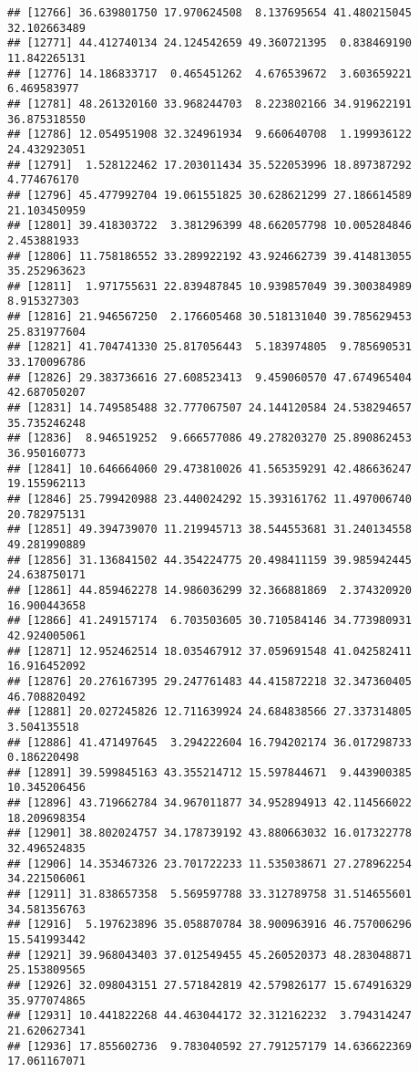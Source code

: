 \documentclass[
]{article}
\begin{document}
\begin{verbatim}
## [12766] 36.639801750 17.970624508  8.137695654 41.480215045 32.102663489
## [12771] 44.412740134 24.124542659 49.360721395  0.838469190 11.842265131
## [12776] 14.186833717  0.465451262  4.676539672  3.603659221  6.469583977
## [12781] 48.261320160 33.968244703  8.223802166 34.919622191 36.875318550
## [12786] 12.054951908 32.324961934  9.660640708  1.199936122 24.432923051
## [12791]  1.528122462 17.203011434 35.522053996 18.897387292  4.774676170
## [12796] 45.477992704 19.061551825 30.628621299 27.186614589 21.103450959
## [12801] 39.418303722  3.381296399 48.662057798 10.005284846  2.453881933
## [12806] 11.758186552 33.289922192 43.924662739 39.414813055 35.252963623
## [12811]  1.971755631 22.839487845 10.939857049 39.300384989  8.915327303
## [12816] 21.946567250  2.176605468 30.518131040 39.785629453 25.831977604
## [12821] 41.704741330 25.817056443  5.183974805  9.785690531 33.170096786
## [12826] 29.383736616 27.608523413  9.459060570 47.674965404 42.687050207
## [12831] 14.749585488 32.777067507 24.144120584 24.538294657 35.735246248
## [12836]  8.946519252  9.666577086 49.278203270 25.890862453 36.950160773
## [12841] 10.646664060 29.473810026 41.565359291 42.486636247 19.155962113
## [12846] 25.799420988 23.440024292 15.393161762 11.497006740 20.782975131
## [12851] 49.394739070 11.219945713 38.544553681 31.240134558 49.281990889
## [12856] 31.136841502 44.354224775 20.498411159 39.985942445 24.638750171
## [12861] 44.859462278 14.986036299 32.366881869  2.374320920 16.900443658
## [12866] 41.249157174  6.703503605 30.710584146 34.773980931 42.924005061
## [12871] 12.952462514 18.035467912 37.059691548 41.042582411 16.916452092
## [12876] 20.276167395 29.247761483 44.415872218 32.347360405 46.708820492
## [12881] 20.027245826 12.711639924 24.684838566 27.337314805  3.504135518
## [12886] 41.471497645  3.294222604 16.794202174 36.017298733  0.186220498
## [12891] 39.599845163 43.355214712 15.597844671  9.443900385 10.345206456
## [12896] 43.719662784 34.967011877 34.952894913 42.114566022 18.209698354
## [12901] 38.802024757 34.178739192 43.880663032 16.017322778 32.496524835
## [12906] 14.353467326 23.701722233 11.535038671 27.278962254 34.221506061
## [12911] 31.838657358  5.569597788 33.312789758 31.514655601 34.581356763
## [12916]  5.197623896 35.058870784 38.900963916 46.757006296 15.541993442
## [12921] 39.968043403 37.012549455 45.260520373 48.283048871 25.153809565
## [12926] 32.098043151 27.571842819 42.579826177 15.674916329 35.977074865
## [12931] 10.441822268 44.463044172 32.312162232  3.794314247 21.620627341
## [12936] 17.855602736  9.783040592 27.791257179 14.636622369 17.061167071

\end{verbatim}
\end{document}
